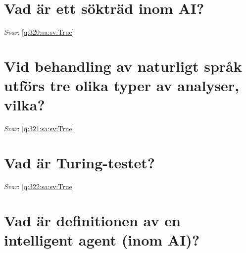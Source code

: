 \documentclass[a4paper,11pt,oneside]{book}
\begin{document}
\begin{sloppypar}
\section{Vad \"ar ett s\"oktr\"ad inom AI?}

\label{q:320:sa:sv:False}

\vspace{2cm}

\noindent\makebox[\textwidth]{\hrulefill}

\vspace{1cm}

\textit{Svar}: \autoref{q:320:sa:sv:True}



\section{Vid behandling av naturligt spr\r{a}k utf\"ors tre olika typer av analyser, vilka?}

\label{q:321:sa:sv:False}

\vspace{2cm}

\noindent\makebox[\textwidth]{\hrulefill}

\vspace{1cm}

\textit{Svar}: \autoref{q:321:sa:sv:True}



\section{Vad \"ar Turing-testet?}

\label{q:322:sa:sv:False}

\vspace{2cm}

\noindent\makebox[\textwidth]{\hrulefill}

\vspace{1cm}

\textit{Svar}: \autoref{q:322:sa:sv:True}



\section{Vad \"ar definitionen av en intelligent agent (inom AI)?}

\label{q:323:sa:sv:False}

\vspace{2cm}

\noindent\makebox[\textwidth]{\hrulefill}


\end{sloppypar}
\end{document}
